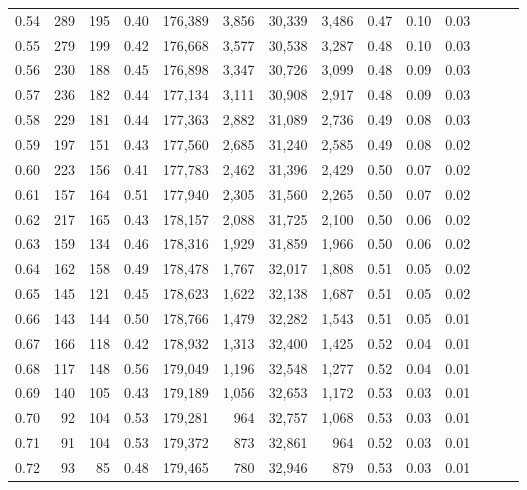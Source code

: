 \begin{tabular}{rrrrrrrrrrrrrr}
0.54 &    289 &    195 &  0.40 &  176,389 &    3,856 &  30,339 &   3,486 &  0.47 &  0.10 &      0.03 \\
0.55 &    279 &    199 &  0.42 &  176,668 &    3,577 &  30,538 &   3,287 &  0.48 &  0.10 &      0.03 \\
0.56 &    230 &    188 &  0.45 &  176,898 &    3,347 &  30,726 &   3,099 &  0.48 &  0.09 &      0.03 \\
0.57 &    236 &    182 &  0.44 &  177,134 &    3,111 &  30,908 &   2,917 &  0.48 &  0.09 &      0.03 \\
0.58 &    229 &    181 &  0.44 &  177,363 &    2,882 &  31,089 &   2,736 &  0.49 &  0.08 &      0.03 \\
0.59 &    197 &    151 &  0.43 &  177,560 &    2,685 &  31,240 &   2,585 &  0.49 &  0.08 &      0.02 \\
0.60 &    223 &    156 &  0.41 &  177,783 &    2,462 &  31,396 &   2,429 &  0.50 &  0.07 &      0.02 \\
0.61 &    157 &    164 &  0.51 &  177,940 &    2,305 &  31,560 &   2,265 &  0.50 &  0.07 &      0.02 \\
0.62 &    217 &    165 &  0.43 &  178,157 &    2,088 &  31,725 &   2,100 &  0.50 &  0.06 &      0.02 \\
0.63 &    159 &    134 &  0.46 &  178,316 &    1,929 &  31,859 &   1,966 &  0.50 &  0.06 &      0.02 \\
0.64 &    162 &    158 &  0.49 &  178,478 &    1,767 &  32,017 &   1,808 &  0.51 &  0.05 &      0.02 \\
0.65 &    145 &    121 &  0.45 &  178,623 &    1,622 &  32,138 &   1,687 &  0.51 &  0.05 &      0.02 \\
0.66 &    143 &    144 &  0.50 &  178,766 &    1,479 &  32,282 &   1,543 &  0.51 &  0.05 &      0.01 \\
0.67 &    166 &    118 &  0.42 &  178,932 &    1,313 &  32,400 &   1,425 &  0.52 &  0.04 &      0.01 \\
0.68 &    117 &    148 &  0.56 &  179,049 &    1,196 &  32,548 &   1,277 &  0.52 &  0.04 &      0.01 \\
0.69 &    140 &    105 &  0.43 &  179,189 &    1,056 &  32,653 &   1,172 &  0.53 &  0.03 &      0.01 \\
0.70 &     92 &    104 &  0.53 &  179,281 &      964 &  32,757 &   1,068 &  0.53 &  0.03 &      0.01 \\
0.71 &     91 &    104 &  0.53 &  179,372 &      873 &  32,861 &     964 &  0.52 &  0.03 &      0.01 \\
0.72 &     93 &     85 &  0.48 &  179,465 &      780 &  32,946 &     879 &  0.53 &  0.03 &      0.01 \\

\end{tabular}
